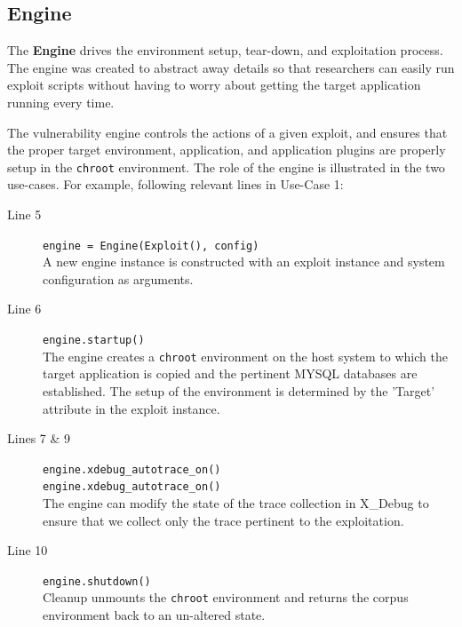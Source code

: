 \documentclass[letterpaper,twocolumn,10pt]{article}
\begin{document}
\subsection{Engine}
The {\bf Engine} drives the environment setup, tear-down, and exploitation process. The engine was created to abstract away details so that researchers can easily run exploit scripts without having to worry about getting the target application running every time. \par
The vulnerability engine controls the actions of a given exploit, and ensures that the proper target environment, application, and application plugins are properly setup in the {\tt chroot} environment. The role of the engine is illustrated in the two use-cases. For example, following relevant lines in Use-Case 1:
\begin{description}
  \item[Line 5] {\tt \footnotesize    engine = Engine(Exploit(), config)} \\ A new engine instance is constructed with an exploit instance and system configuration as arguments.
  \item[Line 6] {\tt \footnotesize     engine.startup()} \\The engine creates a {\tt chroot} environment on the host system to which the target application is copied and the pertinent MYSQL databases are established. The setup of the environment is determined by the 'Target' attribute in the exploit instance. 
  \item[Lines 7 \& 9] {\tt \footnotesize engine.xdebug\_autotrace\_on()\\ engine.xdebug\_autotrace\_on()}\\The engine can modify the state of the trace collection in X\_Debug to ensure that we collect only the trace pertinent to the exploitation.
  \item[Line 10] {\tt \footnotesize engine.shutdown()}\\Cleanup unmounts the {\tt chroot} environment and returns the corpus environment back to an un-altered state.
\end{description}



\end{document}
